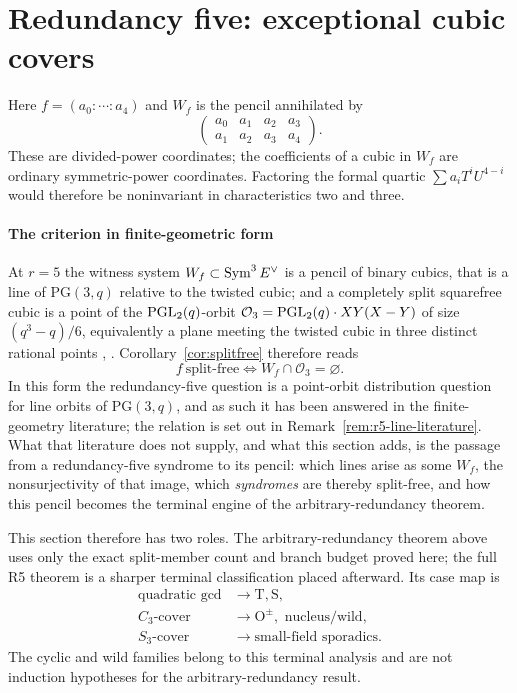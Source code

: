 \section{Redundancy five: exceptional cubic covers}\label{sec:r5}

Here $f=(a_0:\cdots:a_4)$ and $W_f$ is the pencil annihilated by
\[
 \begin{pmatrix}a_0&a_1&a_2&a_3\\a_1&a_2&a_3&a_4\end{pmatrix}.
\]
These are divided-power coordinates; the coefficients of a cubic in
$W_f$ are ordinary symmetric-power coordinates.  Factoring the formal
quartic $\sum a_iT^iU^{4-i}$ would therefore be noninvariant in
characteristics two and three.

\paragraph{The criterion in finite-geometric form}
At $r=5$ the witness system $W_f\subset\operatorname{Sym}^3E^\vee$ is a pencil of
binary cubics, that is a line of $\mathrm{PG}(3,q)$ relative to the twisted
cubic; and a completely split squarefree cubic is a point of the
$\operatorname{PGL}_2(q)$-orbit $\mathcal O_3=\operatorname{PGL}_2(q)\cdot XY(X-Y)$ of size
$(q^3-q)/6$, equivalently a plane meeting the twisted cubic in three
distinct rational points \cite[Prop.~4.1 and Rem.~4.2]{BPS2022},
\cite[Lem.~4.1]{KaipaPradhan2025}.  Corollary~\ref{cor:splitfree}
therefore reads
\begin{equation}\label{eq:r5-orbit-criterion}
       f\ \text{split-free}
       \iff
       W_f\cap\mathcal O_3=\varnothing .
\end{equation}
In this form the redundancy-five question is a point-orbit
distribution question for line orbits of $\mathrm{PG}(3,q)$, and as such it has
been answered in the finite-geometry literature; the relation is set
out in Remark~\ref{rem:r5-line-literature}.  What that literature does
not supply, and what this section adds, is the passage from a
redundancy-five syndrome to its pencil: which lines arise as some
$W_f$, the nonsurjectivity of that image, which \emph{syndromes} are thereby
split-free, and how this pencil becomes the terminal engine of the
arbitrary-redundancy theorem.

This section therefore has two roles.  The arbitrary-redundancy theorem above
uses only the exact split-member count and branch budget proved here; the full
R5 theorem is a sharper terminal classification placed afterward.  Its case
map is
\[
\begin{aligned}
 \text{quadratic gcd}&\longrightarrow \mathrm T,\mathrm S,\\
 C_3\text{-cover}&\longrightarrow \mathrm O^\pm,\text{ nucleus/wild},\\
 S_3\text{-cover}&\longrightarrow\text{small-field sporadics}.
\end{aligned}
\]
The cyclic and wild families belong to this terminal analysis and are not
induction hypotheses for the arbitrary-redundancy result.

